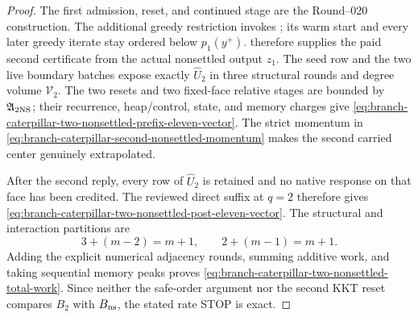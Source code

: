 \begin{proof}
The first admission, reset, and continued stage are the Round--020
construction.  The additional greedy restriction invokes
; its warm start
and every later greedy iterate stay ordered below $p_1(y^+)$.
 therefore supplies
the paid second certificate from the actual nonsettled output $z_1$.  The
seed row and the two live boundary batches expose exactly $\widehat U_2$ in
three structural rounds and degree volume $\mathcal V_2$.  The two resets
and two fixed-face relative stages are bounded by
$\mathfrak A_{\rm 2NS}$; their recurrence, heap/control, state, and memory
charges give
\cref{eq:branch-caterpillar-two-nonsettled-prefix-eleven-vector}.  The strict
momentum in \cref{eq:branch-caterpillar-second-nonsettled-momentum} makes the
second carried center genuinely extrapolated.

After the second reply, every row of $\widehat U_2$ is retained and no native
response on that face has been credited.  The reviewed direct suffix at
$q=2$ therefore gives
\cref{eq:branch-caterpillar-two-nonsettled-post-eleven-vector}.  The
structural and interaction partitions are
\begin{equation*}
 3+(m-2)=m+1,
 \qquad
 2+(m-1)=m+1.
\end{equation*}
Adding the explicit numerical adjacency rounds, summing additive work, and
taking sequential memory peaks proves
\cref{eq:branch-caterpillar-two-nonsettled-total-work}.  Since neither the
safe-order argument nor the second KKT reset compares $B_2$ with
$B_{\rm ns}$, the stated rate STOP is exact.
\end{proof}
